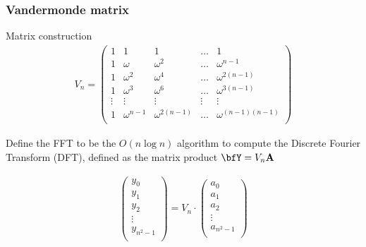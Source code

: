 \documentclass{beamer}
\begin{document}
\begin{frame}
	\frametitle{Vandermonde matrix}
	\begin{block}
		{Matrix construction}
		\begin{align*}
			V_{n} = \left(
			\begin{array}{rrrrr}
				1 & 1 & 1 & \dots & 1 \\
				1 & \omega & \omega^2 & \dots & \omega^{n-1} \\
				1 & \omega^2 & \omega^4 & \dots & \omega^{2(n-1)} \\
				1 & \omega^3 & \omega^6 & \dots & \omega^{3(n-1)} \\
				\vdots & \vdots & \vdots & \vdots & \vdots \\
				1 & \omega^{n-1} & \omega^{2(n-1)} & \dots & \omega^{(n-1)(n-1)} \\
			\end{array}
			\right)
		\end{align*}
	\end{block}
\end{frame}

\begin{frame}
	\begin{definition}
		Define the FFT to be the $O(n \log n)$ algorithm to compute the Discrete Fourier Transform (DFT), defined as the matrix product $\bfY = V_{n} {\bf A}$
	\end{definition}
	\begin{align*}
		\left(
		\begin{array}{l}
			y_0 \\
			y_1 \\
			y_2 \\
			\vdots \\
			y_{n^2-1} \\
		\end{array}
		\right) = V_n \cdot \left(
		\begin{array}{l}
			a_0 \\
			a_1 \\
			a_2 \\
			\vdots \\
			a_{n^2-1} \\
		\end{array}
		\right)
	\end{align*}
\end{frame}
\end{document}
